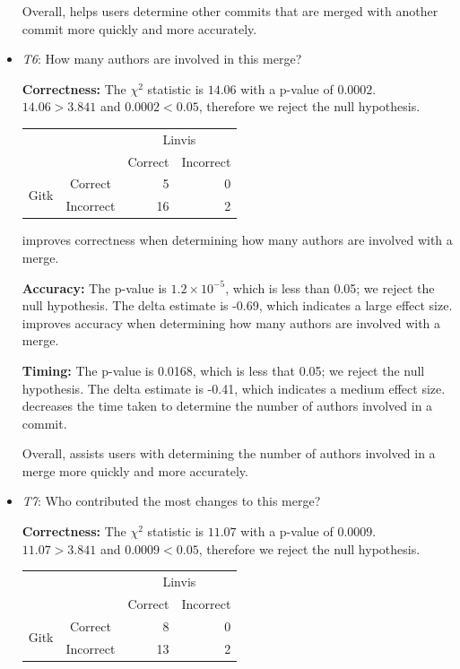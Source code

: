 \begin{itemize}
    Overall, \tool helps users determine other commits that are merged
    with another commit more quickly and more accurately.

  \item \emph{T6}: How many authors are involved in this merge?

    \textbf{Correctness:}
    The $\chi^2$ statistic is $14.06$ with a p-value of $0.0002$.
    $14.06 > 3.841$ and $0.0002 < 0.05$, therefore we reject the null
    hypothesis.

    \vspace{2mm}
    \begin{tabular}{cc|rr}
      &           & \multicolumn{2}{c}{Linvis}\\
      &           & Correct                      & Incorrect\\\hline
      \multirow{2}{*}{Gitk} & Correct   & 5                            & 0\\
      & Incorrect & 16                           & 2\\
    \end{tabular}
    \vspace{3mm}

    \tool improves correctness when determining how many authors are
    involved with a merge.

    \textbf{Accuracy:} The p-value is $1.2 \times 10^{-5}$, which is
    less than 0.05; we reject the null hypothesis. The delta estimate is
    -0.69, which indicates a large effect size. \tool improves accuracy
    when determining how many authors are involved with a merge.

    \textbf{Timing:} The p-value is 0.0168, which is less that 0.05; we
    reject the null hypothesis. The delta estimate is -0.41, which
    indicates a medium effect size. \tool decreases the time taken to
    determine the number of authors involved in a commit.

    Overall, \tool assists users with determining the number of authors
    involved in a merge more quickly and more accurately.

  \item \emph{T7}: Who contributed the most changes to this merge?

    \textbf{Correctness:}
    The $\chi^2$ statistic is $11.07$ with a p-value of $0.0009$.
    $11.07 > 3.841$ and $0.0009 < 0.05$, therefore we reject the null
    hypothesis.

    \vspace{2mm}
    \begin{tabular}{cc|rr}
      &           & \multicolumn{2}{c}{Linvis}\\
      &           & Correct                      & Incorrect\\\hline
      \multirow{2}{*}{Gitk} & Correct   & 8                            & 0\\
      & Incorrect & 13                           & 2\\
    \end{tabular}\\
    \vspace{3mm}


\end{itemize}
